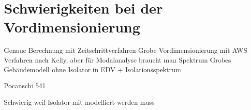 \pagebreak

\section{Schwierigkeiten bei der Vordimensionierung}
\label{sec:schwierigkeitenvordimensionierung}




Genaue Berechnung mit Zeitschrittverfahren
Grobe Vordimensionierung mit AWS Verfahren nach Kelly, aber für Modalanalyse braucht man Spektrum
Grobes Gebäudemodell ohne Isolator in EDV + Isolationsspektrum

Pocanschi 541

Schwierig weil Isolator mit modelliert werden muss




\pagebreak